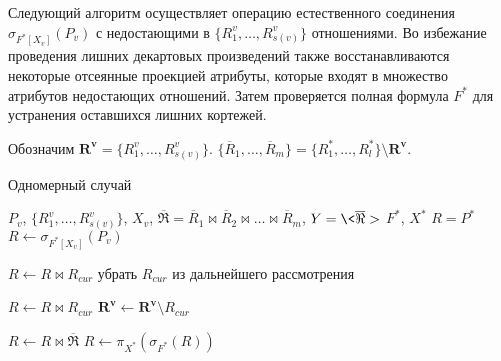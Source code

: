 Следующий алгоритм осуществляет операцию естественного соединения $\sigma_{F^{\ast}[X_v]}(P_v)$ с недостающими в $\{R^v_1, \dots, R^v_{s(v)}\} $ отношениями. Во избежание проведения лишних декартовых произведений также восстанавливаются некоторые отсеянные проекцией атрибуты, которые входят в множество атрибутов недостающих отношений. Затем проверяется полная формула $F^{\ast}$ для устранения оставшихся лишних кортежей.

Обозначим $\mathbf{R^v} = \{R^v_1, \dots, R^v_{s(v)}\} $.
$\{\overline{R}_{1},\dots,\overline{R}_{m}\} = \{R^{\ast}_1,\dots,R^{\ast}_l\}
\setminus \mathbf{R^v}$.
\begin{algorithm}[H]
\caption{Одномерный случай}
\begin{algorithmic}
\REQUIRE
$P_v$,
$\{R^v_1,\dots,R^v_{s(v)}\}$,
$X_v$,
$\overline{\Re} = \overline{R}_1 \bowtie \overline{R}_2\bowtie\ldots\bowtie \overline{R}_m $,
$Y = \<\overline{\Re}> $
$F^{\ast}$,
$X^{\ast}$
\ENSURE $R = P^{\ast}$
\STATE $R \leftarrow \sigma_{F^{\ast}[X_v]}(P_v)$

         \STATE $ R \leftarrow R \bowtie R_{cur} $
         \STATE убрать $R_{cur}$ из дальнейшего рассмотрения
      \ENDIF
   \ENDFOR
   
            \STATE $ R \leftarrow R \bowtie R_{cur} $
            \STATE $\mathbf{R^v} \leftarrow \mathbf{R^v} \setminus R_{cur}$
         \ENDIF
      \ENDFOR
   \ENDIF
\ENDWHILE

\STATE $R \leftarrow R \bowtie \overline{\Re}$
\STATE $R \leftarrow \pi_{X^{\ast}}(\sigma_{F^{\ast}}(R))$
\end{algorithmic}
\end{algorithm}

